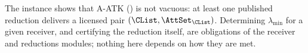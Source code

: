 \begin{example}
The instance shows that A-ATK ()
is not vacuous: at least one published reduction delivers a licensed pair
$(\CList,\AttSet_{\CList})$. Determining $\lambda_{\min}$ for a given
receiver, and certifying the reduction itself, are obligations of the
receiver and reductions modules; nothing here depends on how they are met.
\end{example}
